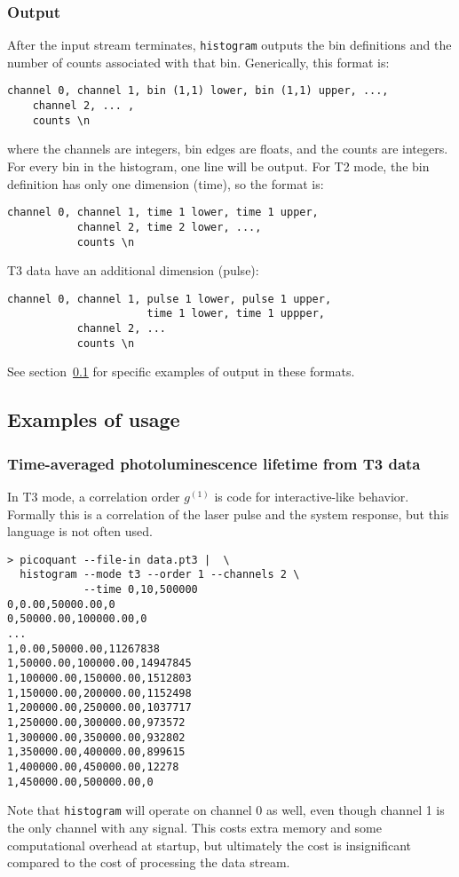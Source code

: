 \documentclass{article}
\newcommand{\histogram}{\texttt{histogram}}
\newcommand{\gn}[1]{\ensuremath{g^{(#1)}}}
\begin{document}
\subsubsection{Output}
After the input stream terminates, \histogram{} outputs the bin definitions and the number of counts associated with that bin. Generically, this format is:
\begin{verbatim}
channel 0, channel 1, bin (1,1) lower, bin (1,1) upper, ...,
    channel 2, ... , 
    counts \n
\end{verbatim}
where the channels are integers, bin edges are floats, and the counts are integers. For every bin in the histogram, one line will be output. For T2 mode, the bin definition has only one dimension (time), so the format is:
\begin{verbatim}
channel 0, channel 1, time 1 lower, time 1 upper, 
           channel 2, time 2 lower, ...,
           counts \n
\end{verbatim}
T3 data have an additional dimension (pulse):
\begin{verbatim}
channel 0, channel 1, pulse 1 lower, pulse 1 upper,
                      time 1 lower, time 1 uppper,
           channel 2, ...
           counts \n
\end{verbatim}
See section~\ref{sec:histogram_examples} for specific examples of output in these formats.


\subsection{Examples of usage}
\label{sec:histogram_examples}
\subsubsection{Time-averaged photoluminescence lifetime from T3 data}
In T3 mode, a correlation order \gn{1} is code for interactive-like behavior. Formally this is a correlation of the laser pulse and the system response, but this language is not often used.
\begin{verbatim}
> picoquant --file-in data.pt3 |  \
  histogram --mode t3 --order 1 --channels 2 \
            --time 0,10,500000
0,0.00,50000.00,0
0,50000.00,100000.00,0
...
1,0.00,50000.00,11267838
1,50000.00,100000.00,14947845
1,100000.00,150000.00,1512803
1,150000.00,200000.00,1152498
1,200000.00,250000.00,1037717
1,250000.00,300000.00,973572
1,300000.00,350000.00,932802
1,350000.00,400000.00,899615
1,400000.00,450000.00,12278
1,450000.00,500000.00,0
\end{verbatim}
Note that \texttt{histogram} will operate on channel 0 as well, even though channel 1 is the only channel with any signal. This costs extra memory and some computational overhead at startup, but ultimately the cost is insignificant compared to the cost of processing the data stream.
\end{document}
